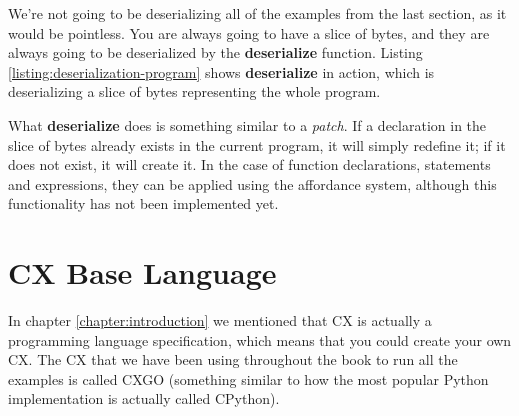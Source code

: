 \documentclass[11pt,fleqn,openany]{book} %
\begin{document}
We're not going to be deserializing all of the examples from the last section, as it would be pointless. You are always going to have a slice of bytes, and they are always going to be deserialized by the \textbf{deserialize} function. Listing \ref{listing:deserialization-program} shows \textbf{deserialize} in action, which is deserializing a slice of bytes representing the whole program.

What \textbf{deserialize} does is something similar to a \emph{patch}. If a declaration in the slice of bytes already exists in the current program, it will simply redefine it; if it does not exist, it will create it. In the case of function declarations, statements and expressions, they can be applied using the affordance system, although this functionality has not been implemented yet.


\chapter{CX Base Language}
\label{chapter:creating-your-own-cx}


In chapter \ref{chapter:introduction} we mentioned that CX is actually a programming language specification, which means that you could create your own CX. The CX that we have been using throughout the book to run all the examples is called CXGO (something similar to how the most popular Python implementation is actually called CPython).
\end{document}
